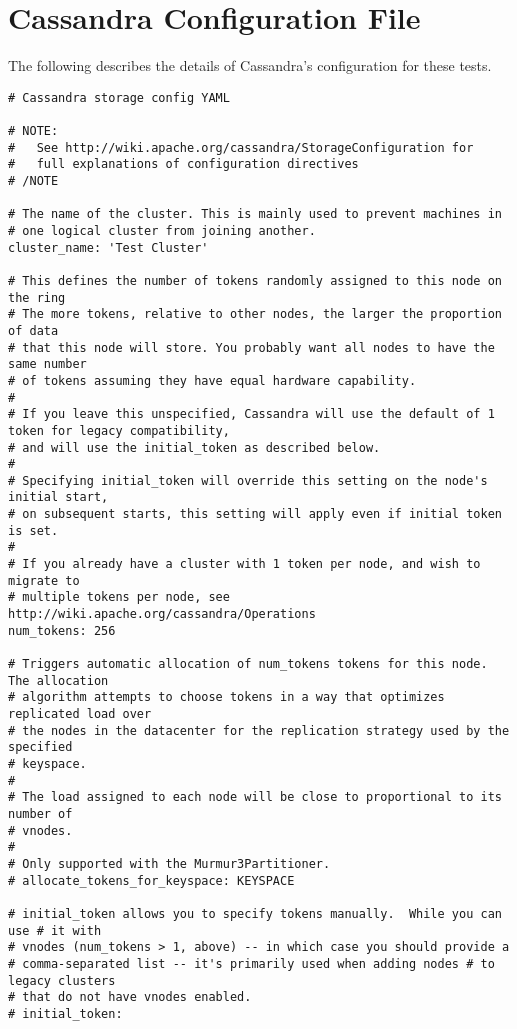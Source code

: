
\chapter{Cassandra Configuration File} %

\label{Appendix_CassandraConfigurationFile} 

The following describes the details of Cassandra's configuration for these tests.
\begin{verbatim}
# Cassandra storage config YAML 

# NOTE:
#   See http://wiki.apache.org/cassandra/StorageConfiguration for
#   full explanations of configuration directives
# /NOTE

# The name of the cluster. This is mainly used to prevent machines in
# one logical cluster from joining another.
cluster_name: 'Test Cluster'

# This defines the number of tokens randomly assigned to this node on the ring
# The more tokens, relative to other nodes, the larger the proportion of data
# that this node will store. You probably want all nodes to have the same number
# of tokens assuming they have equal hardware capability.
#
# If you leave this unspecified, Cassandra will use the default of 1 token for legacy compatibility,
# and will use the initial_token as described below.
#
# Specifying initial_token will override this setting on the node's initial start,
# on subsequent starts, this setting will apply even if initial token is set.
#
# If you already have a cluster with 1 token per node, and wish to migrate to 
# multiple tokens per node, see http://wiki.apache.org/cassandra/Operations
num_tokens: 256

# Triggers automatic allocation of num_tokens tokens for this node. The allocation
# algorithm attempts to choose tokens in a way that optimizes replicated load over
# the nodes in the datacenter for the replication strategy used by the specified
# keyspace.
#
# The load assigned to each node will be close to proportional to its number of
# vnodes.
#
# Only supported with the Murmur3Partitioner.
# allocate_tokens_for_keyspace: KEYSPACE

# initial_token allows you to specify tokens manually.  While you can use # it with
# vnodes (num_tokens > 1, above) -- in which case you should provide a 
# comma-separated list -- it's primarily used when adding nodes # to legacy clusters 
# that do not have vnodes enabled.
# initial_token:


\end{verbatim}
